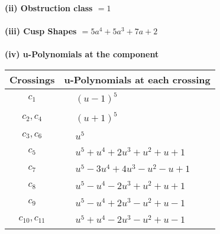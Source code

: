 \documentclass[1p]{elsarticle_modified}
\theoremstyle{definition}
\begin{document}
\flushleft \textbf{(ii) Obstruction class $= 1$}\\~\\
\flushleft \textbf{(iii) Cusp Shapes $= 5 a^4+5 a^3+7 a+2$}\\~\\
\newpage\renewcommand{\arraystretch}{1}
\flushleft \textbf{(iv) u-Polynomials at the component}\newline \\
\begin{tabular}{m{50pt}|m{274pt}}
Crossings & \hspace{64pt}u-Polynomials at each crossing \\
\hline $$\begin{aligned}c_{1}\end{aligned}$$&$\begin{aligned}
&(u-1)^5
\end{aligned}$\\
\hline $$\begin{aligned}c_{2},c_{4}\end{aligned}$$&$\begin{aligned}
&(u+1)^5
\end{aligned}$\\
\hline $$\begin{aligned}c_{3},c_{6}\end{aligned}$$&$\begin{aligned}
&u^5
\end{aligned}$\\
\hline $$\begin{aligned}c_{5}\end{aligned}$$&$\begin{aligned}
&u^5+u^4+2 u^3+u^2+u+1
\end{aligned}$\\
\hline $$\begin{aligned}c_{7}\end{aligned}$$&$\begin{aligned}
&u^5-3 u^4+4 u^3- u^2- u+1
\end{aligned}$\\
\hline $$\begin{aligned}c_{8}\end{aligned}$$&$\begin{aligned}
&u^5- u^4-2 u^3+u^2+u+1
\end{aligned}$\\
\hline $$\begin{aligned}c_{9}\end{aligned}$$&$\begin{aligned}
&u^5- u^4+2 u^3- u^2+u-1
\end{aligned}$\\
\hline $$\begin{aligned}c_{10},c_{11}\end{aligned}$$&$\begin{aligned}
&u^5+u^4-2 u^3- u^2+u-1
\end{aligned}$\\
\hline
\end{tabular}\\~\\
\end{document}
